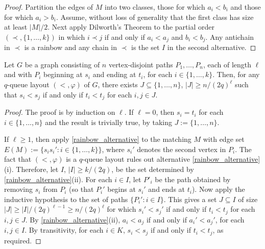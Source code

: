 \documentclass{patmorin}
\begin{document}
\begin{proof}
    Partition the edges of $M$ into two classes, those for which $a_i<b_i$ and those for which $a_i>b_i$.  Assume, without loss of generality that the first class has size at least $|M|/2$.  Next apply Dilworth's Theorem to the partial order $(\prec,\{1,\ldots,k\})$ in which $i\prec j$ if and only if $a_i<a_j$ and $b_i < b_j$.  Any antichain in $\prec$ is a rainbow and any chain in $\prec$ is the set $I$ in the second alternative.
\end{proof}

\begin{lem}\label{rainbow_alternative_paths}
    Let $G$ be a graph consisting of $n$ vertex-disjoint paths $P_1,\ldots,P_n$, each of length $\ell$ and with $P_i$ beginning at $s_i$ and ending at $t_i$, for each $i\in\{1,\ldots,k\}$.  Then, for any $q$-queue layout $(<,\varphi)$ of $G$, there exists $J\subseteq\{1,\ldots,n\}$, $|J|\ge n/(2q)^\ell$ such that $s_i<s_j$ if and only if $t_i<t_j$ for each $i,j\in J$.
\end{lem}

\begin{proof}
    The proof is by induction on $\ell$.  If $\ell=0$, then $s_i=t_i$ for each $i\in\{1,\ldots,n\}$ and the result is trivially true, by taking $J:=\{1,\ldots,n\}$.

    If $\ell\ge 1$, then apply \cref{rainbow_alternative} to the matching $M$ with edge set $E(M):=\{s_is_i':i\in\{1,\ldots,k\}\}$, where $s_i'$ denotes the second vertex in $P_i$.  The fact that $(<,\varphi)$ is a $q$-queue layout rules out alternative \cref{rainbow_alternative}(i).  Therefore, let $I$, $|I|\ge k/(2q)$, be the set determined by \cref{rainbow_alternative}(ii).  For each $i\in I$, let $P'_i$ be the path obtained by removing $s_i$ from $P_i$ (so that $P_i'$ begins at $s_i'$ and ends at $t_i$).  Now apply the inductive hypothesis to the set of paths $\{P_i':i\in I\}$.  This gives a set $J\subseteq I$ of size $|J|\ge |I|/(2q)^{\ell-1}\ge n/(2q)^\ell$ for which $s_i' < s_j'$ if and only if $t_i < t_j$ for each $i,j\in J$.  By \cref{rainbow_alternative}(ii), $a_i < a_j$ if and only if $a_i' < a_j'$, for each $i,j\in I$.  By transitivity, for each $i\in K$, $s_i < s_j$ if and only if $t_i< t_j$, as required.
\end{proof}


\end{document}
